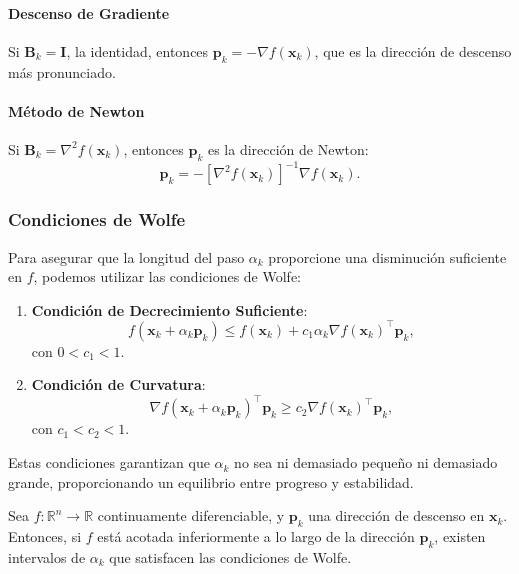 \paragraph{Descenso de Gradiente}

Si $\mathbf{B}_k = \mathbf{I}$, la identidad, entonces $\mathbf{p}_k = -\nabla f(\mathbf{x}_k)$, que es la dirección de descenso más pronunciado.

\paragraph{Método de Newton}

Si $\mathbf{B}_k = \nabla^2 f(\mathbf{x}_k)$, entonces $\mathbf{p}_k$ es la dirección de Newton:
\begin{equation}
\mathbf{p}_k = -[\nabla^2 f(\mathbf{x}_k)]^{-1} \nabla f(\mathbf{x}_k).
\end{equation}

\subsubsection{Condiciones de Wolfe}

Para asegurar que la longitud del paso $\alpha_k$ proporcione una disminución suficiente en $f$, podemos utilizar las condiciones de Wolfe:

\begin{enumerate}
    \item \textbf{Condición de Decrecimiento Suficiente}:
    \begin{equation}
    \label{CondicionDS}
    f(\mathbf{x}_k + \alpha_k \mathbf{p}_k) \leq f(\mathbf{x}_k) + c_1 \alpha_k \nabla f(\mathbf{x}_k)^\top \mathbf{p}_k,
    \end{equation}
    con $0 < c_1 < 1$.
    \item \textbf{Condición de Curvatura}:
    \begin{equation}
    \label{CondicionCur}
    \nabla f(\mathbf{x}_k + \alpha_k \mathbf{p}_k)^\top \mathbf{p}_k \geq c_2 \nabla f(\mathbf{x}_k)^\top \mathbf{p}_k,
    \end{equation}
    con $c_1 < c_2 < 1$.
\end{enumerate}

Estas condiciones garantizan que $\alpha_k$ no sea ni demasiado pequeño ni demasiado grande, proporcionando un equilibrio entre progreso y estabilidad.

\begin{lema}
\label{lema:wolfe}
Sea $f: \mathbb{R}^n \rightarrow \mathbb{R}$ continuamente diferenciable, y $\mathbf{p}_k$ una dirección de descenso en $\mathbf{x}_k$. Entonces, si $f$ está acotada inferiormente a lo largo de la dirección $\mathbf{p}_k$, existen intervalos de $\alpha_k$ que satisfacen las condiciones de Wolfe.
\end{lema}

